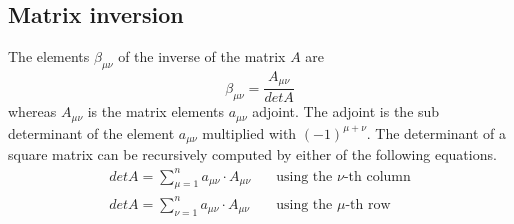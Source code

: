 \documentclass[10pt]{report}
\begin{document}
\subsection{Matrix inversion}

The elements $\beta_{\mu\nu}$ of the inverse of the matrix $A$ are
\begin{equation}
\beta_{\mu\nu} = \frac{A_{\mu\nu}}{det A}
\end{equation}
whereas $A_{\mu\nu}$ is the matrix elements $a_{\mu\nu}$ adjoint.  The
adjoint is the sub determinant of the element $a_{\mu\nu}$ multiplied
with $(-1)^{\mu + \nu}$.  The determinant of a square matrix can be
recursively computed by either of the following equations.
\begin{align}
det A = \sum_{\mu = 1}^{n} a_{\mu\nu}\cdot A_{\mu\nu}
\quad &\text{using the $\nu$-th column}\\
det A = \sum_{\nu = 1}^{n} a_{\mu\nu}\cdot A_{\mu\nu}
\quad &\text{using the $\mu$-th row}
\end{align}
\end{document}
